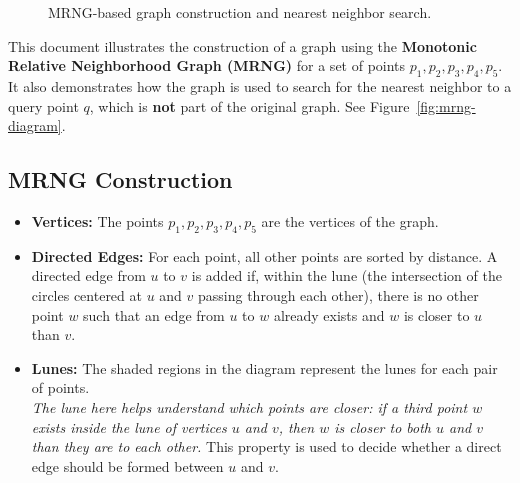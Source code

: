 \documentclass{article}
\begin{document}
\begin{figure}[ht]
    \caption{MRNG-based graph construction and nearest neighbor search.}
    \label{fig:mrng-diagram}
\end{figure}

\noindent This document illustrates the construction of a graph using the \textbf{Monotonic Relative Neighborhood Graph (MRNG)} for a set of points $p_1, p_2, p_3, p_4, p_5$. It also demonstrates how the graph is used to search for the nearest neighbor to a query point $q$, which is \textbf{not} part of the original graph. See Figure~\autoref{fig:mrng-diagram}.

\subsection*{MRNG Construction}
\begin{itemize}
    \item \textbf{Vertices:} The points $p_1, p_2, p_3, p_4, p_5$ are the vertices of the graph.
    \item \textbf{Directed Edges:} For each point, all other points are sorted by distance. A directed edge from $u$ to $v$ is added if, within the lune (the intersection of the circles centered at $u$ and $v$ passing through each other), there is no other point $w$ such that an edge from $u$ to $w$ already exists and $w$ is closer to $u$ than $v$.
    \item \textbf{Lunes:} The shaded regions in the diagram represent the lunes for each pair of points. \\ 
    \textit{The lune here helps understand which points are closer: if a third point $w$ exists inside the lune of vertices $u$ and $v$, then $w$ is closer to both $u$ and $v$ than they are to each other.} This property is used to decide whether a direct edge should be formed between $u$ and $v$.
\end{itemize}
\end{document}
